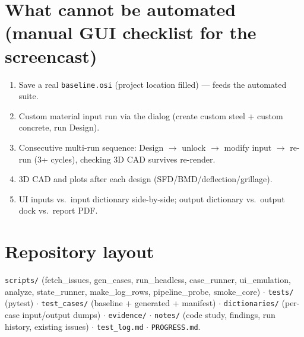 \documentclass[11pt,a4paper]{article}
\begin{document}
\section{What cannot be automated (manual GUI checklist for the screencast)}
\begin{enumerate}[nosep]
  \item Save a real \texttt{baseline.osi} (project location filled) --- feeds the automated suite.
  \item Custom material input run via the dialog (create custom steel + custom concrete, run Design).
  \item Consecutive multi-run sequence: Design $\rightarrow$ unlock $\rightarrow$ modify input $\rightarrow$ re-run (3+ cycles), checking 3D CAD survives re-render.
  \item 3D CAD and plots after each design (SFD/BMD/deflection/grillage).
  \item UI inputs vs.\ input dictionary side-by-side; output dictionary vs.\ output dock vs.\ report PDF.
\end{enumerate}

\section{Repository layout}
\texttt{scripts/} (fetch\_issues, gen\_cases, run\_headless, case\_runner, ui\_emulation, analyze, state\_runner, make\_log\_rows, pipeline\_probe, smoke\_core) $\cdot$ \texttt{tests/} (pytest) $\cdot$ \texttt{test\_cases/} (baseline + generated + manifest) $\cdot$ \texttt{dictionaries/} (per-case input/output dumps) $\cdot$ \texttt{evidence/} $\cdot$ \texttt{notes/} (code study, findings, run history, existing issues) $\cdot$ \texttt{test\_log.md} $\cdot$ \texttt{PROGRESS.md}.
\end{document}
